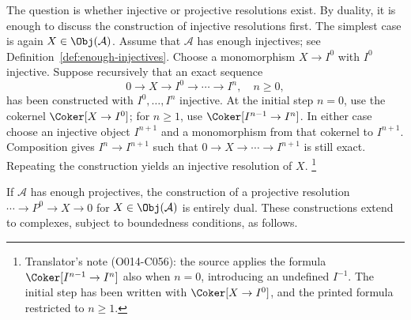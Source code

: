 The question is whether injective or projective resolutions exist. By duality,
it is enough to discuss the construction of injective resolutions first. The
simplest case is again $X\in\Obj(\mathcal{A})$. Assume that $\mathcal{A}$ has
enough injectives; see Definition~\ref{def:enough-injectives}. Choose a
monomorphism $X\to I^0$ with $I^0$ injective. Suppose recursively that an exact
sequence
\[ 0 \to X \to I^0 \to \cdots \to I^n, \quad n \geq 0, \]
has been constructed with $I^0,\ldots,I^n$ injective. At the initial step
$n=0$, use the cokernel $\Coker[X\to I^0]$; for $n\geq1$, use
$\Coker[I^{n-1}\to I^n]$. In either case choose an injective object $I^{n+1}$
and a monomorphism from that cokernel to $I^{n+1}$. Composition gives
$I^n\to I^{n+1}$ such that $0\to X\to\cdots\to I^{n+1}$ is still exact.
Repeating the construction yields an injective resolution of $X$.
\footnote{Translator's note (O014-C056): the source applies the formula
$\Coker[I^{n-1}\to I^n]$ also when $n=0$, introducing an undefined
$I^{-1}$. The initial step has been written with $\Coker[X\to I^0]$, and the
printed formula restricted to $n\geq1$.}

If $\mathcal{A}$ has enough projectives, the construction of a projective
resolution $\cdots\to P^0\to X\to0$ for $X\in\Obj(\mathcal{A})$ is entirely
dual. These constructions extend to complexes, subject to boundedness
conditions, as follows.

